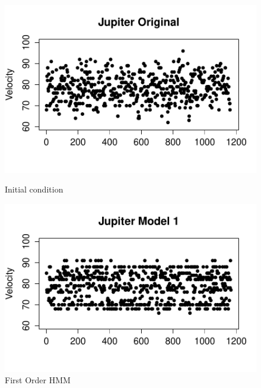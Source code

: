 \documentclass{article} %
\begin{document}
\begin{figure}[ht] 
  \label{ fig7} 
  \begin{minipage}[b]{0.5\linewidth}
    \centering
    \includegraphics[scale = 0.45]{JupiterOriginalVelocity.pdf} 
    \caption{Initial condition\label{JV0}} 
    \vspace{4ex}
  \end{minipage}%
  \begin{minipage}[b]{0.5\linewidth}
    \centering
    \includegraphics[scale = 0.45]{JupiterModel1Velocity.pdf} 
    \caption{First Order HMM\label{JV1}} 
    \vspace{4ex}
  \end{minipage} 
  \begin{minipage}[b]{0.5\linewidth}
    \centering

\end{minipage}
\end{figure}
\end{document}
